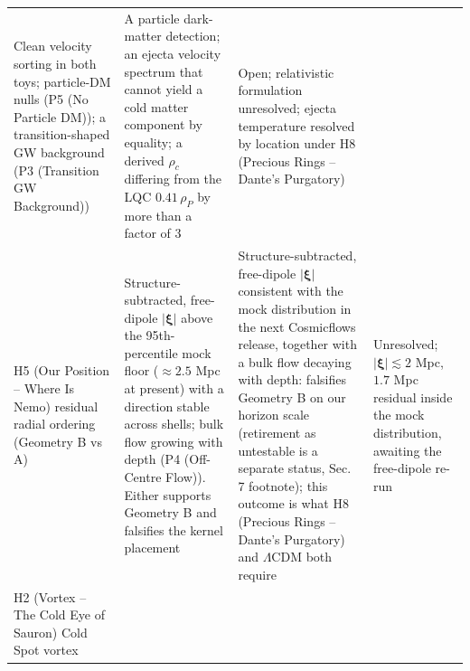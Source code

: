 \documentclass[
  11pt,
]{article}
\begin{document}
\begin{longtable}[]{@{}llll@{}}
\begin{minipage}[t]{0.22\columnwidth}
Clean velocity sorting in both toys; particle-DM nulls (P5 (No Particle
DM)); a transition-shaped GW background (P3 (Transition GW
Background))\strut
\end{minipage} & \begin{minipage}[t]{0.22\columnwidth}\raggedright
A particle dark-matter detection; an ejecta velocity spectrum that
cannot yield a cold matter component by equality; a derived \(\rho_c\)
differing from the LQC \(0.41\,\rho_P\) by more than a factor of
\(3\)\strut
\end{minipage} & \begin{minipage}[t]{0.22\columnwidth}\raggedright
Open; relativistic formulation unresolved; ejecta temperature resolved
by location under H8 (Precious Rings -- Dante's Purgatory)\strut
\end{minipage}\tabularnewline
\begin{minipage}[t]{0.22\columnwidth}\raggedright
H5 (Our Position -- Where Is Nemo) residual radial ordering (Geometry B
vs A)\strut
\end{minipage} & \begin{minipage}[t]{0.22\columnwidth}\raggedright
Structure-subtracted, free-dipole \(|\boldsymbol{\xi}|\) above the
95th-percentile mock floor (\(\approx 2.5\) Mpc at present) with a
direction stable across shells; bulk flow growing with depth (P4
(Off-Centre Flow)). Either supports Geometry B and falsifies the kernel
placement\strut
\end{minipage} & \begin{minipage}[t]{0.22\columnwidth}\raggedright
Structure-subtracted, free-dipole \(|\boldsymbol{\xi}|\) consistent with
the mock distribution in the next Cosmicflows release, together with a
bulk flow decaying with depth: falsifies Geometry B on our horizon scale
(retirement as untestable is a separate status, Sec. 7 footnote); this
outcome is what H8 (Precious Rings -- Dante's Purgatory) and
\(\Lambda\)CDM both require\strut
\end{minipage} & \begin{minipage}[t]{0.22\columnwidth}\raggedright
Unresolved; \(|\boldsymbol{\xi}| \lesssim 2\) Mpc, \(1.7\) Mpc residual
inside the mock distribution, awaiting the free-dipole re-run\strut
\end{minipage}\tabularnewline
\begin{minipage}[t]{0.22\columnwidth}\raggedright
H2 (Vortex -- The Cold Eye of Sauron) Cold Spot vortex\strut
\end{minipage} & \begin{minipage}[t]{0.22\columnwidth}\raggedright

\end{minipage}
\end{longtable}
\end{document}
